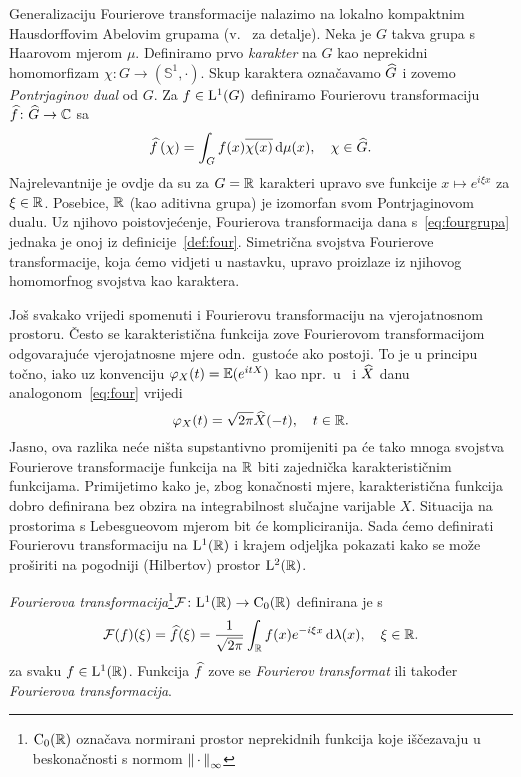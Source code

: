 \documentclass[main.tex]{subfiles}
\begin{document}
Generalizaciju Fourierove transformacije nalazimo na lokalno kompaktnim Hausdorffovim Abelovim grupama (v.~\cite[,5.2]{gogic} za detalje).
Neka je \( G \) takva grupa s Haarovom mjerom \( \mu \).
Definiramo prvo \emph{karakter} na \( G \) kao neprekidni homomorfizam \( \chi \colon G \to \left( \mathbb S^1, \cdot \right) \).
Skup karaktera označavamo \( \widehat{G} \) i zovemo \emph{Pontrjaginov dual} od \( G \). Za
\( f \in \mathrm{L}^1(G) \) definiramo Fourierovu transformaciju \( \widehat{f} \colon \widehat{G} \to \mathbb{C} \) sa
\begin{equation}\label{eq:fourgrupa}
	\widehat{f} \left( \chi \right) =
	\int_G f(x) \overline{\chi(x)} \,\mathrm d \mu(x), \quad \chi \in \widehat{G}.
\end{equation}
Najrelevantnije je ovdje da su za \( G = \mathbb{R} \) karakteri upravo sve
funkcije \( x \mapsto e^{i\xi x} \) za \( \xi \in \mathbb{R} \).
Posebice, \( \mathbb{R} \) (kao aditivna grupa) je izomorfan
svom Pontrjaginovom dualu. Uz njihovo poistovjećenje,
Fourierova transformacija dana s~\eqref{eq:fourgrupa}
jednaka je onoj iz definicije~\ref{def:four}.
Simetrična svojstva Fourierove transformacije, koja ćemo vidjeti u nastavku, upravo
proizlaze iz njihovog homomorfnog svojstva kao karaktera.

Još svakako vrijedi spomenuti i Fourierovu transformaciju na vjerojatnosnom prostoru.
Često se karakteristična funkcija zove Fourierovom transformacijom odgovarajuće
vjerojatnosne mjere odn.\ gustoće ako postoji.
To je u principu točno, iako uz konvenciju
\( \varphi_X(t)=\mathbb{E}(e^{itX}) \) kao npr.\ u~\cite[]{sarapa}
i \( \widehat{X} \) danu analogonom~\eqref{eq:four} vrijedi
\begin{equation}
	\varphi_X(t) = \sqrt{2\pi}\widehat{X}(-t), \quad t \in \mathbb{R}.
\end{equation}
Jasno, ova razlika neće ništa supstantivno promijeniti pa će tako
mnoga svojstva Fourierove trans\-formacije funkcija na \( \mathbb{R} \)
biti zajednička karakterističnim funkcijama. Primijetimo
kako je, zbog konačnosti mjere, karakteristična funkcija
dobro definirana bez obzira na integrabilnost slučajne
varijable \( X \). Situacija na prostorima s Lebesgueovom mjerom
bit će kompliciranija. Sada ćemo definirati
Fourierovu transformaciju na \( \mathrm{L}^1(\mathbb{R}) \) i krajem odjeljka pokazati
kako se može proširiti na pogodniji (Hilbertov)
prostor \( \mathrm{L}^2(\mathbb{R}) \).

\newcommand{\fusnotaxxx}{\footnote{\( \mrC_0(\R) \) označava normirani prostor neprekidnih funkcija koje iščezavaju u beskonačnosti s normom \( \dotnorm_\infty \)}}
\begin{definicija}\label{def:four}
	\emph{Fourierova transformacija}\fusnotaxxx \( \mathcal F \colon \mathrm{L}^1(\mathbb{R}) \to \mathrm C_0(\mathbb{R}) \)
	definirana je s
	\begin{equation}\label{eq:four}
		\mathcal F(f)(\xi) = \widehat{f}(\xi) =
		\frac 1{\sqrt{2\pi}} \int_{\mathbb{R}} f(x)e^{-i\xi x} \,\mathrm d \lambda(x), \quad
		\xi \in \mathbb{R}.
	\end{equation}
	za svaku \( f \in \mathrm{L}^1(\mathbb{R}) \). Funkcija \( \widehat{f} \)
	zove se \emph{Fourierov transformat} ili također \emph{Fourierova trans\-for\-ma\-ci\-ja}.
\end{definicija}
\end{document}
